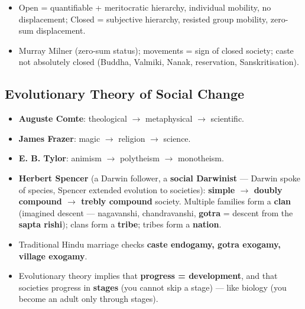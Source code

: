 \begin{QuickRevision}
\begin{itemize}
    \item Open = quantifiable + meritocratic hierarchy, individual mobility, no displacement; Closed = subjective hierarchy, resisted group mobility, zero-sum displacement.
    \item Murray Milner (zero-sum status); movements = sign of closed society; caste not absolutely closed (Buddha, Valmiki, Nanak, reservation, Sanskritisation).
\end{itemize}
\end{QuickRevision}

\sectiondivider

\subsection{Evolutionary Theory of Social Change}

\begin{KeyConcept}
\begin{itemize}
    \item \textbf{Auguste Comte}: theological $\rightarrow$ metaphysical $\rightarrow$ scientific.
    \item \textbf{James Frazer}: magic $\rightarrow$ religion $\rightarrow$ science.
    \item \textbf{E. B. Tylor}: animism $\rightarrow$ polytheism $\rightarrow$ monotheism.
    \item \textbf{Herbert Spencer} (a Darwin follower, a \textbf{social Darwinist} --- Darwin spoke of species, Spencer extended evolution to societies): \textbf{simple $\rightarrow$ doubly compound $\rightarrow$ trebly compound} society. Multiple families form a \textbf{clan} (imagined descent --- nagavanshi, chandravanshi, \textbf{gotra} = descent from the \textbf{sapta rishi}); clans form a \textbf{tribe}; tribes form a \textbf{nation}.
    \item Traditional Hindu marriage checks \textbf{caste endogamy, gotra exogamy, village exogamy}.
\end{itemize}
\end{KeyConcept}

\begin{CriticalPoint}
\begin{itemize}
    \item Evolutionary theory implies that \textbf{progress = development}, and that societies progress in \textbf{stages} (you cannot skip a stage) --- like biology (you become an adult only through stages).
\end{itemize}
\end{CriticalPoint}

